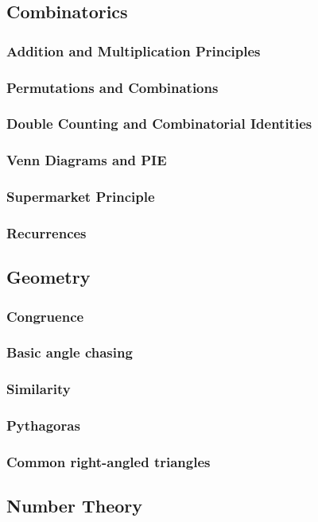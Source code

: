 \documentclass{amsart}
\begin{document}
\subsection{Combinatorics}
\subsubsection{Addition and Multiplication Principles}
\subsubsection{Permutations and Combinations}
\subsubsection{Double Counting and Combinatorial Identities}
\subsubsection{Venn Diagrams and PIE}
\subsubsection{Supermarket Principle}
\subsubsection{Recurrences}
\subsection{Geometry}
\subsubsection{Congruence}
\subsubsection{Basic angle chasing}
\subsubsection{Similarity}
\subsubsection{Pythagoras}
\subsubsection{Common right-angled triangles}
\subsection{Number Theory}
\end{document}
